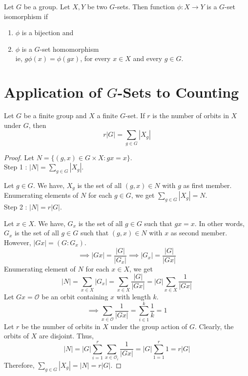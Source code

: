 \begin{definition}
	Let $G$ be a group. Let $X,Y$ be two $G$-sets. Then function $\phi : X \to Y$ is a $G$-set isomorphism if 
	\begin{enumerate}
		\item $\phi$ is a bijection and
		\item $\phi$ is a $G$-set homomorphism\\
		ie, $g\phi(x) = \phi(gx)$, for every $x \in X$ and every $g \in G$.
	\end{enumerate}
\end{definition}

\section{Application of $G$-Sets to Counting}
\begin{theorem}[Burnside]
	Let $G$ be a finite group and $X$ a finite $G$-set.
	If $r$ is the number of orbits in $X$ under $G$, then
	\begin{equation}
		r|G| = \sum_{g \in G}|X_g|
	\end{equation}
\end{theorem}
\begin{proof}
	Let $N = \{ (g,x) \in G \times X : gx = x \}$.\\
	Step 1 : $|N| = \sum\limits_{g \in G}|X_g|$.

	Let $g \in G$.
	We have, $X_g$ is the set of all $(g,x) \in N$ with $g$ as first member.
	Enumerating elements of $N$ for each $g \in G$, we get $\sum\limits_{g \in G}|X_g| = N$. \\
	Step 2 : $|N| = r|G|$.

	Let $x \in X$.
	We have, $G_x$ is the set of all $g \in G$ such that $gx = x$.
	In other words, $G_x$ is the set of all $g \in G$ such that $(g,x) \in N$ with $x$ as second member.
	However, $|Gx| = (G:G_x)$.
	\[ \implies |Gx| = \frac{|G|}{|G_x|} \implies |G_x| = \frac{|G|}{|Gx|} \]
	Enumerating element of $N$ for each $x \in X$, we get
	\[ |N| = \sum\limits_{x \in X} |G_x| = \sum\limits_{x \in X} \frac{|G|}{|Gx|} = |G| \sum\limits_{x \in X} \frac{1}{|Gx|} \]
	Let $Gx = \mathscr{O}$ be an orbit containing $x$ with length $k$.
	\[ \implies \sum\limits_{x \in \mathscr{O}} \frac{1}{|Gx|} = \sum\limits_{i \in 1}^k \frac{1}{k} = 1 \]
	Let $r$ be the number of orbits in $X$ under the group action of $G$.
	Clearly, the orbits of $X$ are disjoint. Thus,
	\[|N| = |G|\sum\limits_{i = 1}^r \sum\limits_{x \in \mathscr{O}_i} \frac{1}{|Gx|} = |G|\sum\limits_{1 = 1}^r 1 = r|G|\]
	Therefore, $\sum\limits_{g \in G} |X_g| = |N| = r|G|$.
\end{proof}

